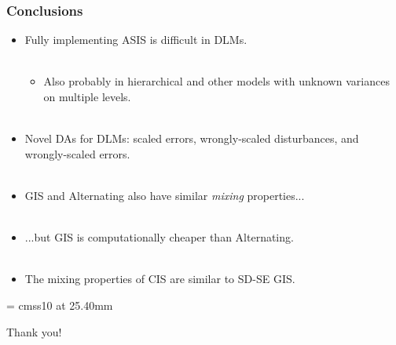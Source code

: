 \documentclass[xcolor=dvipsnames]{beamer}
\begin{document}
\begin{frame}
\frametitle{Conclusions}
\begin{itemize}
\item Fully implementing ASIS is difficult in DLMs.\\~\\
\begin{itemize}
\item[]Also probably in hierarchical and other models with unknown variances on multiple levels.\\~\\
\end{itemize}

\item Novel DAs for DLMs: scaled errors, wrongly-scaled disturbances, and wrongly-scaled errors.\\~\\

\item GIS and Alternating also have similar {\it mixing} properties...\\~\\

\item ...but GIS is computationally cheaper than Alternating.\\~\\

\item The mixing properties of CIS are similar to SD-SE GIS.

\end{itemize}
\end{frame}

\appendix
{}
\setcounter{finalframe}{\value{framenumber}}

\begin{frame}

      \begin{center}

        \font\endfont = cmss10 at 25.40mm
        \color{Red}
        \endfont 
        \baselineskip 20.0mm

        Thank you!

      \end{center}    


\end{frame}
\end{document}
